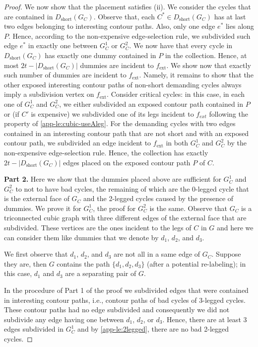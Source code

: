 \documentclass[runningheads]{llncs}
\newcommand{\ext}{\operatorname{ext}}
\newcommand{\short}{\operatorname{short}}
\begin{document}
\begin{proof}
We now show that the placement satisfies (ii). We consider the cycles that are contained in $D_{\short}(G_C)$. Observe that, each $C^*\in D_{\short}(G_C)$ has at last two edges belonging to interesting contour paths. Also, only one edge $e^*$ lies along $P$. Hence, according to the non-expensive edge-selection rule, we subdivided such edge $e^*$ in exactly one between $G^1_C$ or $G^2_C$.
We now have that every cycle in $D_{\short}(G_C)$ has exactly one dummy contained in $P$ in the collection. Hence, at most $2t-|D_{\short}(G_C)|$ dummies are incident to $f_{\ext}$. We show now that exactly such number of dummies are incident to $f_{\ext}$. Namely, it remains to show that the other exposed interesting contour paths of non-short demanding cycles always imply a subdivision vertex on $f_{\ext}$. %
Consider critical cycles: in this case, in each one of $G^1_C$ and $G^2_C$, we either subdivided an exposed contour path contained in $P$ or (if $C'$ is expensive) we subdivided one of its legs incident to $f_{ext}$ following the property of \cref{app-le:cubic-useAleg}. For the demanding cycles with two edges contained in an interesting contour path that are not short and with an exposed contour path, we subdivided an edge incident to $f_{\ext}$ in both $G^1_C$ and $G^2_C$ by the non-expensive edge-selection rule. Hence, the collection has exactly $2t-|D_{\short}(G_C)|$ edges placed on the exposed contour path $P$ of $C$.

\smallskip \noindent
{\sffamily\bfseries Part 2.} Here we show that the dummies placed above are sufficient for $G^1_C$ and $G^2_C$ to not to have bad cycles, the remaining of which are the 0-legged cycle that is the external face of $G_C$ and the 2-legged cycles caused by the presence of dummies. We prove it for $G^1_C$, the proof for $G^2_C$ is the same.  Observe that $G_C$ is a triconnected cubic graph with three different edges of the external face that are subdivided. These vertices are the ones incident to the legs of $C$ in $G$ and here we can consider them like dummies that we denote by $d_1$, $d_2$, and $d_3$. %

We first observe that $d_1$, $d_2$, and $d_3$ are not all in a same edge of $G_C$. Suppose they are, then $G$ contains the path $\{d_1,d_2,d_3\}$ (after a potential re-labeling); in this case, $d_1$ and $d_3$ are a separating pair of $G$.  

In the procedure of Part 1 of the proof we subdivided edges that were contained in interesting contour paths, i.e., contour paths of bad cycles of 3-legged cycles. These contour paths had no edge subdivided and consequently we did not subdivide any edge having one between $d_1$, $d_2$, or $d_3$. Hence, there are at least 3 edges subdivided in $G^1_C$ and by \cref{app-le:2legged}, there are no bad 2-legged cycles. 


\end{proof}
\end{document}

